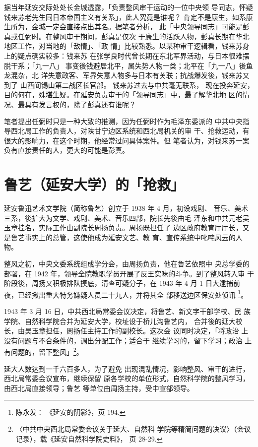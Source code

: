 据当年延安交际处处长金城透露，「负责整风审干运动的一位中央领
导同志，怀疑钱来苏老先生同日本帝国主义有关系」，此人究竟是谁呢？
肯定不是康生，如系康生所为，金城一定会直接点出其名。据笔者分析，
此「中央领导同志」可能是彭真或任弼时。在整风审干期间，彭真是仅次
于康生的活跃人物，彭真长期在华北地区工作，对当地的「敌情」、「政
情」比较熟悉。以某种审干逻辑看，钱来苏身上的疑点确实较多：钱来苏
在张学良时代曾长期在东北军界活动，与日本很难摆脱干系；「九一八」
事变後钱避居北平，属失势人物一类；北平在「九一八」後鱼龙混杂，北
洋失意政客、军界失意人物多与日本有关联；抗战爆发後，钱来苏又到了
山西阎锡山第二战区长官部。
钱来苏过去与中共毫无联系，
现在投奔延安，
目的何在，殊堪生疑。在延安负责审干的「领导同志」中，最了解华北地
区的情况、最具有发言权的，除了彭真还有谁呢？

笔者提出任弼时只是一种大致的推测，因为任弼时作为毛泽东委派的
中共中央指导西北局工作的负责人，对陕甘宁边区系统和西北局机关的审
干、抢救运动，有很大的影响力，在这个时期，他经常过问具体案件。但
笔者认为，对钱来苏一案负有直接责任的人，更大的可能是彭真。

\section{鲁艺（延安大学）的「抢救」}

延安鲁迅艺术文学院（简称鲁艺）创立于 1938 年 4 月，初设戏剧、
音乐、美术三系，後扩大为文学、戏剧、美术、音乐四部，院长先後由毛
泽东和中共元老吴玉章挂名，实际工作由副院长周扬负责。周扬既担任了
边区政府教育厅厅长，又是鲁艺事实上的总管，这使他成为延安文艺、教
育、宣传系统中叱咤风云的人物。

整风之初，中央文委系统组成学分会，由周扬负责，他在鲁艺依照中 央总学委的
部署，在 1942 年，领导全院教职学员开展了反王实味的斗争。到了整风转入审
干阶段後，周扬又积极排队摸底，清查可疑分子，在 1943 年 4 月 1 日大逮捕前
夜，已经揪出重大特务嫌疑人员二十九人，并将其全 部移送边区保安处侦讯
\footnote{陈永发： 《延安的阴影》，页 194.}。

1943 年 3 月 16 日，中共西北局常委会议决定，将鲁艺、新文字干部学校、民
族学院、自然科学院合并为延安大学，校址设于桥儿沟鲁艺内， 合并後的延大校
长，由吴玉章担任，周扬任主持工作的副校长。这次会 议同时决定，「将政治
上没有问题与不合条件的，调出分配工作；适合于 继续学习的，留下学习；政治
上有问题的，留下整风」\footnote{〈中共中央西北局常委会议关于延大、自然科
学院等精简问题的决议〉（会议记录），载《延安自然科学院史料》， 页
28-29.}。

延大人数达到一千六百多人，为了避免
出现混乱情况，影响整风、审干的进行，西北局常委会议宣布，继续保留
原各学校的单位形式，自然科学院的整风学习，由西北局直接领导；鲁艺
等单位由周扬主持，受中宣部领导。

